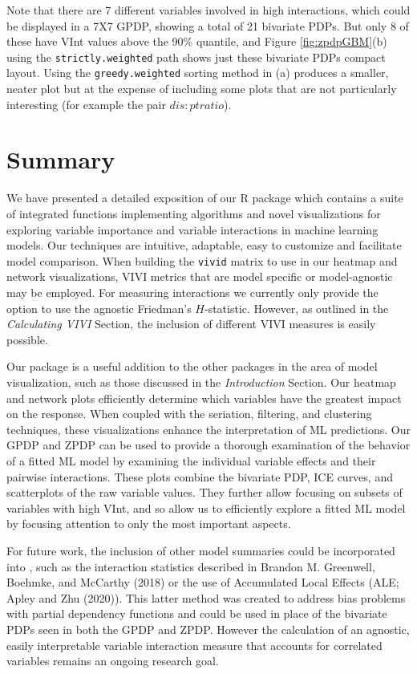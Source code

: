 Note that there are 7 different variables involved in high interactions, which could be displayed in a 7X7 GPDP, showing a total of 21 bivariate PDPs. But only 8 of these have VInt values above the 90\% quantile, and Figure \ref{fig:zpdpGBM}(b) using the \texttt{strictly.weighted} path shows just these bivariate PDPs compact layout. Using the \texttt{greedy.weighted} sorting method in (a) produces a smaller, neater plot but at the expense of including some plots that are not particularly interesting (for example the pair \(dis:ptratio\)).

\hypertarget{summary}{%
\section{Summary}\label{summary}}

We have presented a detailed exposition of our R package  which contains a suite of integrated functions implementing algorithms and novel visualizations for exploring variable importance and variable interactions in machine learning models. Our techniques are intuitive, adaptable, easy to customize and facilitate model comparison. When building the \texttt{vivid} matrix to use in our heatmap and network visualizations, VIVI metrics that are model specific or model-agnostic may be employed. For measuring interactions we currently only provide the option to use the agnostic Friedman's \(H\)-statistic. However, as outlined in the \emph{Calculating VIVI} Section, the inclusion of different VIVI measures is easily possible.

Our  package is a useful addition to the other packages in the area of model visualization, such as those discussed in the \emph{Introduction} Section. Our heatmap and network plots efficiently determine which variables have the greatest impact on the response. When coupled with the seriation, filtering, and clustering techniques, these visualizations enhance the interpretation of ML predictions. Our GPDP and ZPDP can be used to provide a thorough examination of the behavior of a fitted ML model by examining the individual variable effects and their pairwise interactions. These plots combine the bivariate PDP, ICE curves, and scatterplots of the raw variable values. They further allow focusing on subsets of variables with high VInt, and so allow us to efficiently explore a fitted ML model by focusing attention to only the most important aspects.

For future work, the inclusion of other model summaries could be incorporated into , such as the interaction statistics described in Brandon M. Greenwell, Boehmke, and McCarthy (2018) or the use of Accumulated Local Effects (ALE; Apley and Zhu (2020)). This latter method was created to address bias problems with partial dependency functions and could be used in place of the bivariate PDPs seen in both the GPDP and ZPDP. However the calculation of an agnostic, easily interpretable variable interaction measure that accounts for correlated variables remains an ongoing research goal.

